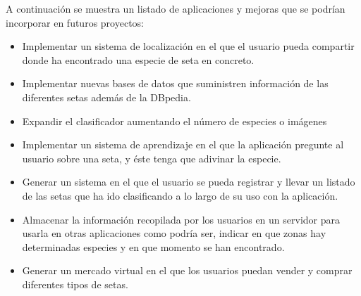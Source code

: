 A continuación se muestra un listado de aplicaciones y mejoras que se podrían incorporar en futuros proyectos:

\begin{itemize}
	\item Implementar un sistema de localización en el que el usuario pueda compartir donde ha encontrado una especie de seta en concreto.
	\item Implementar nuevas bases de datos que suministren información de las diferentes setas además de la DBpedia.
	\item Expandir el clasificador aumentando el número de especies o imágenes
	\item Implementar un sistema de aprendizaje en el que la aplicación pregunte al usuario sobre una seta, y éste tenga que adivinar la especie.
	\item Generar un sistema en el que el usuario se pueda registrar y llevar un listado de las setas que ha ido clasificando a lo largo de su uso con la aplicación.
	\item Almacenar la información recopilada por los usuarios en un servidor para usarla en otras aplicaciones como podría ser, indicar en que zonas hay determinadas especies y en que momento se han encontrado.
	\item Generar un mercado virtual en el que los usuarios puedan vender y comprar diferentes tipos de setas.
\end{itemize}
